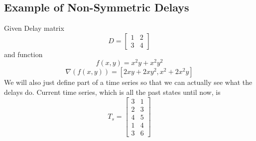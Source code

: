 \documentclass[10pt]{elsarticle}
\theoremstyle{remark}
\begin{document}
\subsection*{Example of Non-Symmetric Delays}
Given Delay matrix
\begin{equation}
D = \begin{bmatrix}
1&2 \\
3&4 
\end{bmatrix}
\end{equation}
and function
\begin{equation}
f(x,y) = x^2y+x^2y^2
\end{equation}
\begin{equation}
\nabla(f(x,y)) = [2xy+2xy^2, x^2+2x^2y]
\end{equation}
We will also just define part of a time series so that we can actually see what the delays do.
Current time series, which is all the past states until now, is
\[
T_s = \begin{bmatrix}
3&1 \\
2&3 \\
4&5 \\
1&4 \\
3&6
\end{bmatrix}
\]
\end{document}

